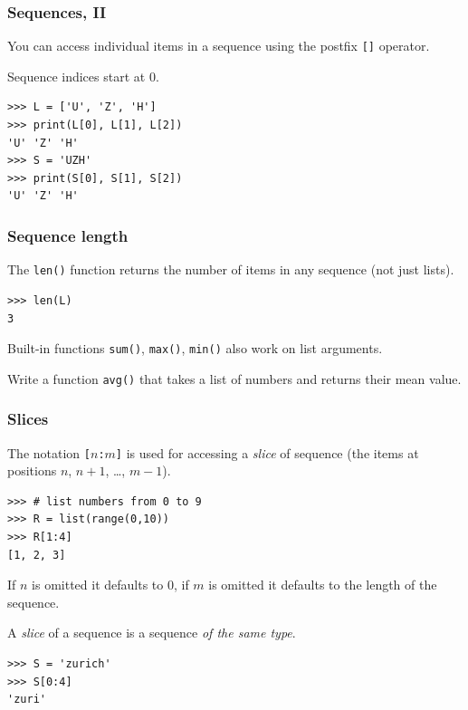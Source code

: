 \documentclass[english,serif,mathserif,xcolor=pdftex,dvipsnames,table]{beamer}
\begin{document}
\begin{frame}
  \frametitle{Sequences, II}
  You can access individual items in a sequence using the postfix
  \texttt{[]} operator.

  \+
  Sequence indices start at 0.

\begin{lstlisting}
>>> L = ['U', 'Z', 'H']
>>> print(L[0], L[1], L[2])
'U' 'Z' 'H'
>>> S = 'UZH'
>>> print(S[0], S[1], S[2])
'U' 'Z' 'H'
\end{lstlisting}
\end{frame}


\begin{frame}[fragile]
  \frametitle{Sequence length}
The \texttt{len()} function returns the number of items in any
  sequence (not just lists).
\begin{lstlisting}
>>> len(L)
3
\end{lstlisting}

  \+ Built-in functions \lstinline|sum()|, \lstinline|max()|, \lstinline|min()|
  also work on list arguments.
\end{frame}


\begin{frame}
  \begin{exercise*}[3.A]
    Write a function \texttt{avg()} that takes a list of numbers and returns
    their mean value.
  \end{exercise*}
\end{frame}


\begin{frame}[fragile]
  \frametitle{Slices}
  The notation \texttt{[$n$:$m$]} is used for accessing a \emph{slice}
  of sequence (the items at positions $n$, $n+1$, \ldots, $m-1$).

\begin{lstlisting}
>>> # list numbers from 0 to 9
>>> R = list(range(0,10))
>>> R[1:4]
[1, 2, 3]
\end{lstlisting}

  \+
  If $n$ is omitted it defaults to 0, if $m$ is omitted it defaults to
  the length of the sequence.

  \+ A \textit{slice} of a sequence is a sequence \textit{of the same
  type}.
\begin{lstlisting}
>>> S = 'zurich'
>>> S[0:4]
'zuri'
\end{lstlisting}
\end{frame}
\end{document}
